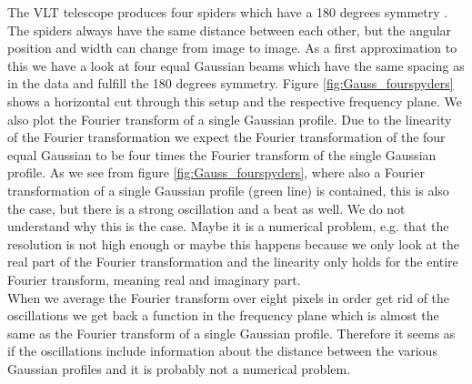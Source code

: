 The VLT telescope produces four spiders which have a 180 degrees symmetry \cite{ESOmanual}. The spiders always have the same distance between each other, but the angular position and width can change from image to image. As a first approximation to this we have a look at four equal Gaussian beams which have the same spacing as in the data and fulfill the 180 degrees symmetry. Figure \ref{fig:Gauss_fourspyders} shows a horizontal cut through this setup and the respective frequency plane. We also plot the Fourier transform of a single Gaussian profile. Due to the linearity of the Fourier transformation we expect the Fourier transformation of the four equal Gaussian to be four times the Fourier transform of the single Gaussian profile. As we see from figure \ref{fig:Gauss_fourspyders}, where also a Fourier transformation of a single Gaussian profile (green line) is contained, this is also the case, but there is a strong oscillation and a beat as well. We do not understand why this is the case. Maybe it is a numerical problem, e.g. that the resolution is not high enough or maybe this happens because we only look at the real part of the Fourier transformation and the linearity only holds for the entire Fourier transform, meaning real and imaginary part.\\
When we average the Fourier transform over eight pixels in order get rid of the oscillations we get back a function in the frequency plane which is almost the same as the Fourier transform of a single Gaussian profile. Therefore it seems as if the oscillations include information about the distance between the various Gaussian profiles and it is probably not a numerical problem.
